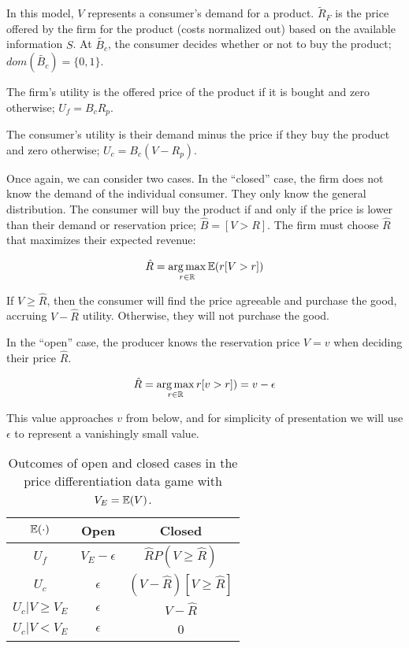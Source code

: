 \documentclass[../thesis.tex]{subfiles}
\begin{document}
In this model, $V$ represents a consumer's demand for a product.
$\tilde{R}_F$ is the price offered by the firm for the product
(costs normalized out) based on the available information $S$.
At $\tilde{B_c}$, the consumer decides whether or not to buy
the product; $dom(\tilde{B_c}) = \{0,1\}$.

The firm's utility is the offered price of the product if
it is bought and zero otherwise; $U_f = B_c R_p$.

The consumer's utility is their demand minus the price if
they buy the product and zero otherwise; $U_c = B_c (V - R_p)$.

Once again, we can consider two cases.
In the ``closed'' case,
the firm does not know the demand of the individual
consumer.
They only know the general distribution.
The consumer will buy the product if and only if
the price is lower than their demand or reservation price;
$\hat{B} = [V > R]$.
The firm must choose $\hat{R}$ that maximizes their expected
revenue:

$$\hat{R} = \operatorname*{arg\,max}_{r \in \mathbb{R}} \mathbb{E}(r [V > r])$$

If $V \geq \hat{R}$, then the consumer will find the
price agreeable and purchase the good, accruing $V - \hat{R}$
utility.
Otherwise, they will not purchase the good.

In the ``open'' case, the producer knows the reservation price
$V = v$ when deciding their price $\hat{R}$.

$$\hat{R} = \operatorname*{arg\,max}_{r \in \mathbb{R}} r [v > r]) = v - \epsilon$$

This value approaches $v$ from below, and for simplicity of
presentation we will use $\epsilon$ to represent a vanishingly
small value.

\begin{table}
\begin{center}
\begin{tabular}{ |c|c|c| } 
 \hline
  $\mathbb{E}(\cdot)$ & Open & Closed  \\
 \hline
 $U_f$ & $V_E - \epsilon$ & $\hat{R} P(V \geq \hat{R})$ \\ 
 $U_c$ & $\epsilon$ & $(V - \hat{R}) [V \geq \hat{R}]$  \\
 $U_c \vert V \geq V_E$ & $\epsilon$ & $V - \hat{R}$  \\
 $U_c \vert V < V_E$ & $\epsilon$ & 0  \\
 \hline
\end{tabular}
\end{center}
\caption{Outcomes of open and closed cases in the price differentiation data game with $V_E = \mathbb{E}(V)$.}
\end{table}
\end{document}
